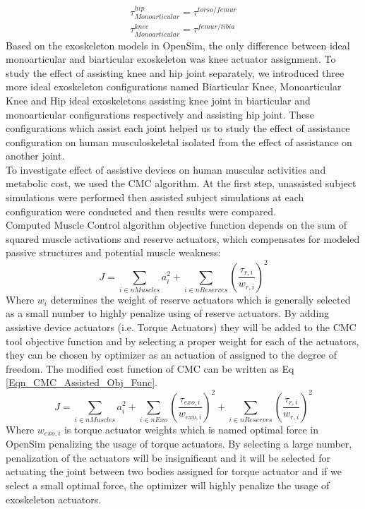\documentclass[10pt,letterpaper]{article}
\begin{document}
\begin{align}\label{Eqn_Monoarticular_Torque_Act}
\tau^{hip}_{Monoarticular} = \tau^{torso/femur}\\
\tau^{knee}_{Monoarticular} = \tau^{femur/tibia}
\end{align}
Based on the exoskeleton models in OpenSim, the only difference between ideal monoarticular and biarticular exoskeleton was knee actuator assignment. To study the effect of assisting knee and hip joint separately, we introduced three more ideal exoskeleton configurations named Biarticular Knee, Monoarticular Knee and Hip ideal exoskeletons assisting knee joint in biarticular and monoarticular configurations respectively and assisting hip joint. These configurations which assist each joint helped us to study the effect of assistance configuration on human musculoskeletal isolated from the effect of assistance on another joint.\\

To investigate effect of assistive devices on human muscular activities and metabolic cost, we used the CMC algorithm. At the first step, unassisted subject simulations were performed then assisted subject simulations at each configuration were conducted and then results were compared.\\
Computed Muscle Control algorithm objective function depends on the sum of squared muscle activations and reserve actuators, which compensates for modeled passive structures and potential muscle weakness\cite{93}:
\begin{equation}\label{Eqn_CMC_Normal_Obj_Func}
J = \sum_{i\in nMuscles} a_{i}^{2} + \sum_{i \in nReserves} (\frac{\tau_{r,i}}{w_{r,i}})^2
\end{equation}
Where $w_i$ determines the weight of reserve actuators which is generally selected as a small number to highly penalize using of reserve actuators. By adding assistive device actuators (i.e. Torque Actuators) they will be added to the CMC tool objective function and by selecting a proper weight for each of the actuators, they can be chosen by optimizer as an actuation of assigned to the degree of freedom. The modified cost function of CMC can be written as Eq \eqref{Eqn_CMC_Assisted_Obj_Func}.
\begin{equation}\label{Eqn_CMC_Assisted_Obj_Func}
	J = \sum_{i\in nMuscles} a_{i}^{2} + \sum_{i \in nExo} \left(\frac{\tau_{exo,i}}{w_{exo,i}}\right)^{2} +  \sum_{i \in nReserves} \left(\frac{\tau_{r,i}}{w_{r,i}}\right)^2
\end{equation}
Where $w_{exo,i}$ is torque actuator weights which is named optimal force in OpenSim \cite{93} penalizing the usage of torque actuators. By selecting a large number, penalization of the actuators will be insignificant and it will be selected for actuating the joint between two bodies assigned for torque actuator and if we select a small optimal force, the optimizer will highly penalize the usage of exoskeleton actuators.\\
\end{document}
